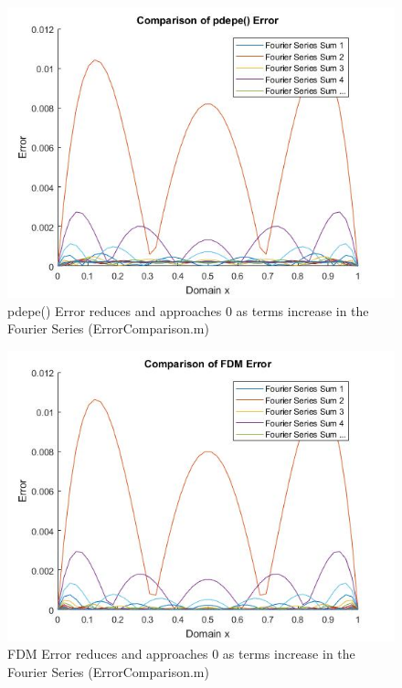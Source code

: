 \documentclass{article}
\begin{document}
\begin{figure}[hp]
	\begin{center}
		\includegraphics[width=\textwidth,height=\textheight,keepaspectratio]{MATLAB/Err1.jpg}
	\end{center}
	\caption{pdepe() Error reduces and approaches 0 as terms increase in the Fourier Series (ErrorComparison.m)}
\end{figure}
\newpage
\begin{figure}[hp]
	\begin{center}
		\includegraphics[width=\textwidth,height=\textheight,keepaspectratio]{MATLAB/Err2.jpg}
	\end{center}
	\caption{FDM Error reduces and approaches 0 as terms increase in the Fourier Series (ErrorComparison.m)}
\end{figure}
\end{document}
